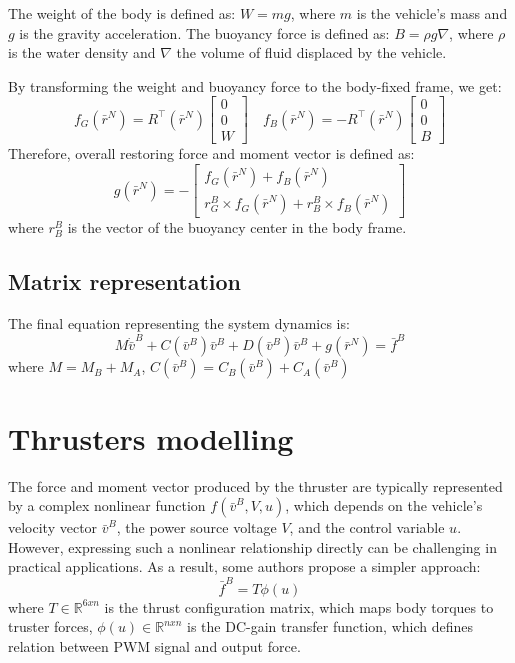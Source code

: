     The weight of the body is defined as: $W=m g$, where $m$ is the vehicle's mass and $g$ is the gravity acceleration. 
    The buoyancy force is defined as: $B=\rho g \nabla$, where $\rho$ is the water density and $\nabla$ the volume of fluid displaced by the vehicle. 
    
    By transforming the weight and buoyancy force to the body-fixed frame, we get:
    $$
    f_G\left(\bar{r}^N\right)=R^{\top}\left(\bar{r}^N\right)\left[\begin{array}{l}
    0 \\
    0 \\
    W
    \end{array}\right] \quad f_B\left(\bar{r}^N\right)=-R^{\top}\left(\bar{r}^N\right)\left[\begin{array}{l}
    0 \\
    0 \\
    B
    \end{array}\right]
    $$
    Therefore, overall restoring force and moment vector is defined as:
    $$
    g(\bar{r}^N)=-\left[\begin{array}{c}
    f_G(\bar{r}^N)+f_B(\bar{r}^N) \\
    r_G^B \times f_G(\bar{r}^N)+r_B^B \times f_B(\bar{r}^N)
    \end{array}\right]
    $$
    where $r_B^B$ is the vector of the buoyancy center in the body frame. 

\subsection{Matrix representation}

    The final equation representing the system dynamics is:
    $$
        M \dot{\bar{v}}^B + C(\bar{v}^B) \bar{v}^B+D(\bar{v}^B) \bar{v}^B+g(\bar{r}^N)= \bar{f}^B
    $$
    where $M=M_B+M_A$, $C(\bar{v}^B)=C_B(\bar{v}^B)+C_A(\bar{v}^B)$

\section{Thrusters modelling}

    The force and moment vector produced by the thruster are typically represented 
    by a complex nonlinear function $f(\bar{v}^B, V, u)$, which depends on the 
    vehicle's velocity vector $\bar{v}^B$, the power source voltage $V$, and the 
    control variable $u$. 
    However, expressing such a nonlinear relationship directly can be challenging 
    in practical applications. As a result, some authors propose a simpler approach:
    $$
    \bar{f}^B=T\phi(u)
    $$
    where $T \in \mathbb{R}^{6 x n}$ is the thrust configuration matrix, which maps body torques to truster forces, 
    $\phi(u) \in \mathbb{R}^{n x n}$ is the DC-gain transfer function, which defines relation between
    PWM signal and output force.

